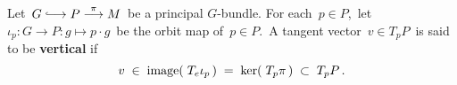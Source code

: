 
\vskip 0.5cm
\begin{definition}
\mbox{}
\vskip 0.1cm
\noindent
Let \,$G \longhookrightarrow P \overset{\pi}{\longrightarrow} M$\, be a principal $G$-bundle.
For each \,$p \in P$,\, let \,$\iota_{p} : G \longrightarrow P : g \longmapsto p \cdot g$\, be the orbit map of \,$p \in P$.\,
A tangent vector \,$v \in T_{p}P$\, is said to be \textbf{vertical} if
\begin{equation*}
v \;\in\; \textnormal{image}\!\left(\;T_{e}\iota_{p}\,\right) \;=\; \ker\!\left(\;T_{p}\pi\,\right) \;\subset\; T_{p}P\,.
\end{equation*}
\end{definition}



